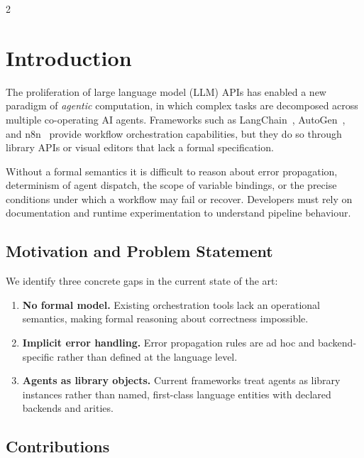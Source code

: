 \documentclass[10pt]{article}
\begin{document}
\begin{multicols}{2}

\section{Introduction}
\label{sec:intro}

The proliferation of large language model (LLM) APIs has enabled a new paradigm
of \emph{agentic} computation, in which complex tasks are decomposed across
multiple co-operating AI agents.  Frameworks such as LangChain~\cite{langchain},
AutoGen~\cite{autogen}, and n8n~\cite{n8n} provide workflow orchestration
capabilities, but they do so through library APIs or visual editors that lack a
formal specification.

Without a formal semantics it is difficult to reason about error propagation,
determinism of agent dispatch, the scope of variable bindings, or the precise
conditions under which a workflow may fail or recover.  Developers must rely on
documentation and runtime experimentation to understand pipeline behaviour.

\subsection{Motivation and Problem Statement}

We identify three concrete gaps in the current state of the art:

\begin{enumerate}
  \item \textbf{No formal model.}  Existing orchestration tools lack an
        operational semantics, making formal reasoning about correctness
        impossible.
  \item \textbf{Implicit error handling.}  Error propagation rules are
        ad hoc and backend-specific rather than defined at the language level.
  \item \textbf{Agents as library objects.}  Current frameworks treat agents as
        library instances rather than named, first-class language entities with
        declared backends and arities.
\end{enumerate}

\subsection{Contributions}


\end{multicols}
\end{document}
